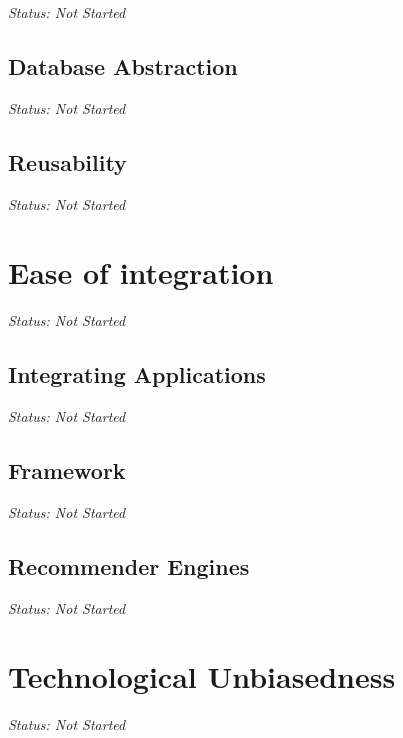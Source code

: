 \emph{Status: Not Started}

\subsection{Database Abstraction}

\emph{Status: Not Started}

\subsection{Reusability}

\emph{Status: Not Started}

\section{Ease of integration}

\emph{Status: Not Started}

\subsection{Integrating Applications}

\emph{Status: Not Started}

\subsection{Framework}

\emph{Status: Not Started}

\subsection{Recommender Engines}

\emph{Status: Not Started}

\section{Technological Unbiasedness}

\emph{Status: Not Started}
